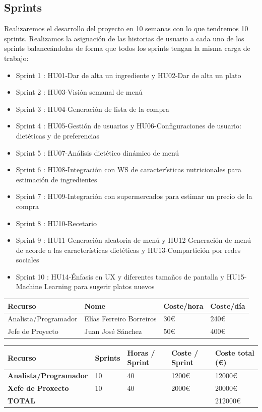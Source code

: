 \documentclass[12pt, a4paper, twoside]{book}
\begin{document}
	\subsection{Sprints}
	Realizaremos el desarrollo del proyecto en 10 semanas con lo que tendremos 10 sprints. Realizamos la asignación de las historias de usuario a cada uno de los sprints balanceándolas de forma que todos los sprints tengan la misma carga de trabajo:
	\begin{itemize}
		\item Sprint 1 : HU01-Dar de alta un ingrediente y HU02-Dar de alta un plato
		\item Sprint 2 : HU03-Visión semanal de menú
		\item Sprint 3 : HU04-Generación de lista de la compra
		\item Sprint 4 : HU05-Gestión de usuarios y HU06-Configuraciones de usuario: dietéticas y de preferencias
		\item Sprint 5 : HU07-Análisis dietético dinámico de menú
		\item Sprint 6 : HU08-Integración con WS de características nutricionales para estimación de ingredientes
		\item Sprint 7 : HU09-Integración con supermercados para estimar un precio de la compra
		\item Sprint 8 : HU10-Recetario
		\item Sprint 9 : HU11-Generación aleatoria de menú y HU12-Generación de menú de acorde a las características dietéticas y HU13-Compartición por redes sociales
		\item Sprint 10 : HU14-Énfasis en UX y diferentes tamaños de pantalla y HU15-Machine Learning para sugerir platos nuevos
	\end{itemize}
	
	
	\begin{tabular}{| p{5cm} | p{3cm} | p{3cm} | p{3cm} |}
		\hline
		\textbf{Recurso} & \textbf{Nome} & \textbf{Coste/hora} & \textbf{Coste/día}
		\\ \hline
		{Analista/Programador} & {Elías Ferreiro Borreiros} & {30\euro} & {240\euro}
		\\ \hline
		{Jefe de Proyecto} & {Juan José Sánchez} & {50\euro} & {400\euro}
		\\ \hline
		
	\end{tabular}		
	
	
	\begin{tabular}{|p{5cm} | p{2cm} | p{2cm} | p{2cm} | p{2cm} |}
		
		\hline
		\textbf{Recurso} & \textbf{Sprints} & \textbf{Horas / Sprint} & \textbf{Coste / Sprint} & \textbf{Coste total (\euro)}
		\\ \hline
		\textbf{Analista/Programador} & 10 & 40 & 1200\euro  & 12000\euro
		\\ \hline
		\textbf{Xefe de Proxecto} & 10 & 40 & 2000\euro & 20000\euro		
		\\ \hline
		\textbf{TOTAL} & & & & 212000\euro
		\\ \hline
	\end{tabular}
	
	
\end{document}
